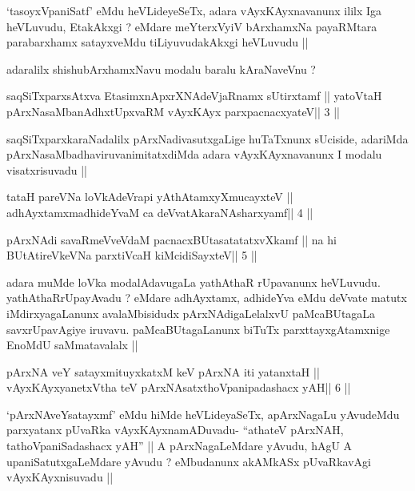 \begin{artha}
`tasoyxVpaniSatf' eMdu heVLideyeSeTx, adara vAyxKAyxnavanunx ililx Iga
  heVLuvudu, EtakAkxgi ? eMdare meYterxVyiV bArxhamxNa payaRMtara
  parabarxhamx satayxveMdu tiLiyuvudakAkxgi heVLuvudu ||

adaralilx shishubArxhamxNavu modalu baralu kAraNaveVnu ?
\end{artha}

\begin{shl}
saqSiTxparxsAtxva EtasimxnApxrXNAdeVjaRnamx sUtirxtamf ||
yatoV\s taH pArxNasaMbanAdhxtUpxvaRM vAyxKAyx parxpacnacxyateV\hfill || 3 ||
\end{shl}

\begin{artha}
saqSiTxparxkaraNadalilx pArxNadivasutxgaLige huTaTxnunx sUciside,
adariMda pArxNasaMbadhaviruvanimitatxdiMda adara vAyxKAyxnavanunx I
modalu visatxrisuvadu ||
\end{artha}

\begin{shl}
tataH pareVNa loVkAdeVrapi yAthAtamxyXmucayxteV ||
adhAyxtamxmadhideYvaM ca deVvatAkaraNAsharxyamf\hfill || 4 ||
\end{shl}

\begin{shl}
pArxNAdi savaRmeVveVdaM pacnacxBUtasatatatxvXkamf ||
na hi BUtAtireVkeVNa parxtiVcaH kiMcidiSayxteV\hfill || 5 ||
\end{shl}

\begin{artha}
adara muMde loVka modalAdavugaLa yathAthaR rUpavanunx
heVLuvudu. yathAthaRrUpayAvadu ? eMdare adhAyxtamx, adhideYva eMdu
deVvate matutx iMdirxyagaLanunx avalaMbisidudx pArxNAdigaLelalxvU
paMcaBUtagaLa savxrUpavAgiye iruvavu. paMcaBUtagaLanunx biTuTx
parxttayxgAtamxnige EnoMdU saMmatavalalx ||
\end{artha}

\begin{shl}
pArxNA veY satayxmituyxkatxM keV pArxNA iti yatanxtaH ||
vAyxKAyxyanetxV\s tha teV pArxNAsatxthoVpanipadashacx yAH\hfill || 6 ||
\end{shl}

\begin{artha}
`pArxNAveYsatayxmf' eMdu hiMde heVLideyaSeTx, apArxNagaLu yAvudeMdu
  parxyatanx pUvaRka vAyxKAyxnamADuvadu- ``athateV pArxNAH,
  tathoVpaniSadashacx yAH'' || A pArxNagaLeMdare yAvudu, hAgU A
  upaniSatutxgaLeMdare yAvudu ? eMbudanunx akAMkASx pUvaRkavAgi
  vAyxKAyxnisuvadu ||
\end{artha}

